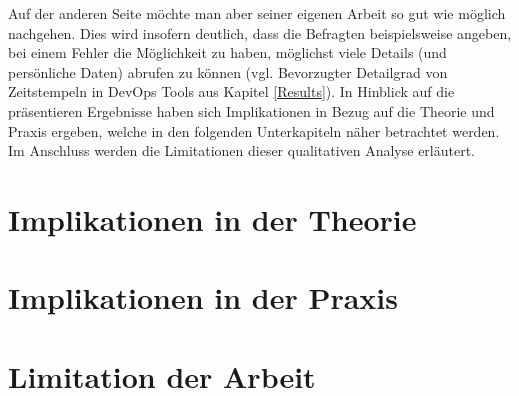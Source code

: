 Auf der anderen Seite möchte man aber seiner eigenen Arbeit so gut wie möglich nachgehen. Dies wird insofern deutlich, dass die Befragten beispielsweise angeben, bei einem Fehler die Möglichkeit zu haben, möglichst viele Details (und persönliche Daten) abrufen zu können (vgl. Bevorzugter Detailgrad von Zeitstempeln
in DevOps Tools aus Kapitel \ref{Results}). \newline \newline
In Hinblick auf die präsentieren Ergebnisse haben sich Implikationen in Bezug auf die Theorie und Praxis ergeben, welche in den folgenden Unterkapiteln näher betrachtet werden. Im Anschluss werden die Limitationen dieser qualitativen Analyse erläutert.

\section{Implikationen in der Theorie}

\section{Implikationen in der Praxis}

\section{Limitation der Arbeit}
